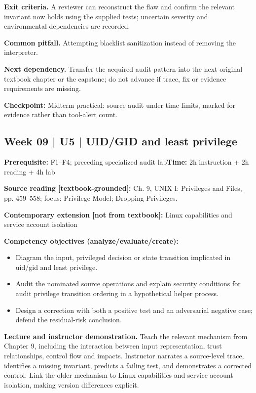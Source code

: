 \documentclass[10pt,letterpaper]{article}
\begin{document}
\textbf{Exit criteria.} A reviewer can reconstruct the flaw and confirm the relevant invariant now holds using the supplied tests; uncertain severity and environmental dependencies are recorded.

\textbf{Common pitfall.} Attempting blacklist sanitization instead of removing the interpreter.

\textbf{Next dependency.} Transfer the acquired audit pattern into the next original textbook chapter or the capstone; do not advance if trace, fix or evidence requirements are missing.

\begin{historynote}\textbf{Checkpoint:} Midterm practical: source audit under time limits, marked for evidence rather than tool-alert count.\end{historynote}
\subsection{Week 09 | U5 | UID/GID and least privilege}
\textbf{Prerequisite:} F1--F4; preceding specialized audit lab\hfill\textbf{Time:} 2h instruction + 2h reading + 4h lab

\textbf{Source reading [textbook-grounded]:} Ch. 9, UNIX I: Privileges and Files, pp. 459--558; focus: Privilege Model; Dropping Privileges.

\textbf{Contemporary extension [not from textbook]:} Linux capabilities and service account isolation

\textbf{Competency objectives (analyze/evaluate/create):}
\begin{itemize}[leftmargin=*,itemsep=2pt]
\item Diagram the input, privileged decision or state transition implicated in uid/gid and least privilege.
\item Audit the nominated source operations and explain security conditions for audit privilege transition ordering in a hypothetical helper process.
\item Design a correction with both a positive test and an adversarial negative case; defend the residual-risk conclusion.
\end{itemize}
\textbf{Lecture and instructor demonstration.} Teach the relevant mechanism from Chapter 9, including the interaction between input representation, trust relationships, control flow and impacts. Instructor narrates a source-level trace, identifies a missing invariant, predicts a failing test, and demonstrates a corrected control. Link the older mechanism to Linux capabilities and service account isolation, making version differences explicit.
\end{document}
